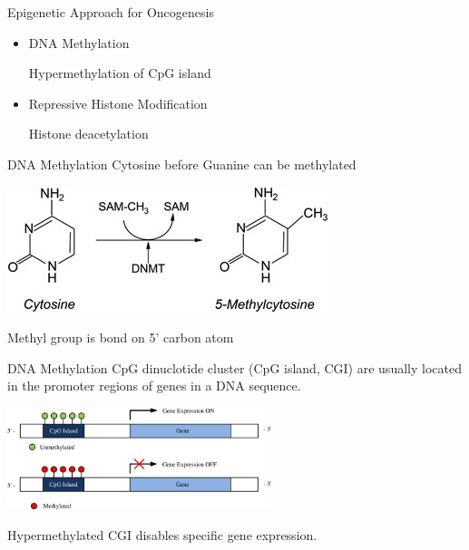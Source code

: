 \documentclass{beamer}
\begin{document}
    \begin{frame}{Epigenetic Approach for Oncogenesis}
        \begin{itemize}
            \item DNA Methylation
            
                  \vspace{1em}
                  Hypermethylation of CpG island

            \vspace{3em}
            \item Repressive Histone Modification
                  
                  \vspace{1em}
                  Histone deacetylation
        \end{itemize}
    \end{frame}

    \begin{frame}{DNA Methylation}
        Cytosine before Guanine can be methylated

        \begin{center}
            \includegraphics{5mc.png}
        \end{center}

        Methyl group is bond on 5' carbon atom
    \end{frame}

    \begin{frame}{DNA Methylation}
        CpG dinuclotide cluster (CpG island, CGI) are usually located in the promoter regions of genes in a DNA sequence.
        \begin{center}
            \includegraphics[height=8em]{1}
        \end{center}
        Hypermethylated CGI disables specific gene expression.
    \end{frame}
\end{document}
